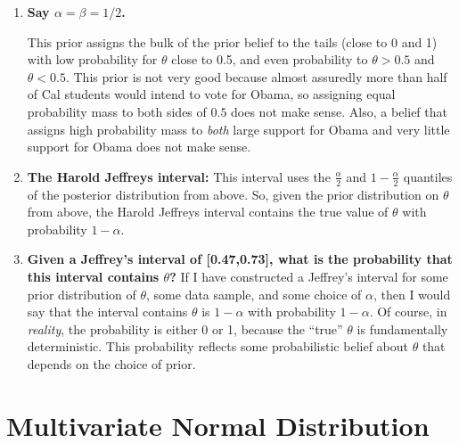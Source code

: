 \documentclass{article}[12pt]
\begin{document}
\begin{enumerate}
	\item \textbf{Say $\alpha = \beta = 1/2$.}
	
	This prior assigns the bulk of the prior belief to the tails (close to 0 and 1) with low probability for $\theta$ close to 0.5, and even probability to $\theta > 0.5$ and $\theta < 0.5$. This prior is not very good because almost assuredly more than half of Cal students would intend to vote for Obama, so assigning equal probability mass to both sides of $0.5$ does not make sense. Also, a belief that assigns high probability mass to \emph{both} large support for Obama and very little support for Obama does not make sense.

	\item \textbf{The Harold Jeffreys interval:} This interval uses the $\frac{\alpha}{2}$ and $1 - \frac{\alpha}{2}$ quantiles of the posterior distribution from above. So, given the prior distribution on $\theta$ from above, the Harold Jeffreys interval contains the true value of $\theta$ with probability $1-\alpha$.

	\item \textbf{Given a Jeffrey's interval of [0.47,0.73], what is the probability that this interval contains $\theta$?} If I have constructed a Jeffrey's interval for some prior distribution of $\theta$, some data sample, and some choice of $\alpha$, then I would say that the interval contains $\theta$ is $1-\alpha$ with probability $1-\alpha$. Of course, in \emph{reality}, the probability is either 0 or 1, because the ``true'' $\theta$ is fundamentally deterministic. This probability reflects some probabilistic belief about $\theta$ that depends on the choice of prior.

\end{enumerate}

\section{Multivariate Normal Distribution}
\end{document}
